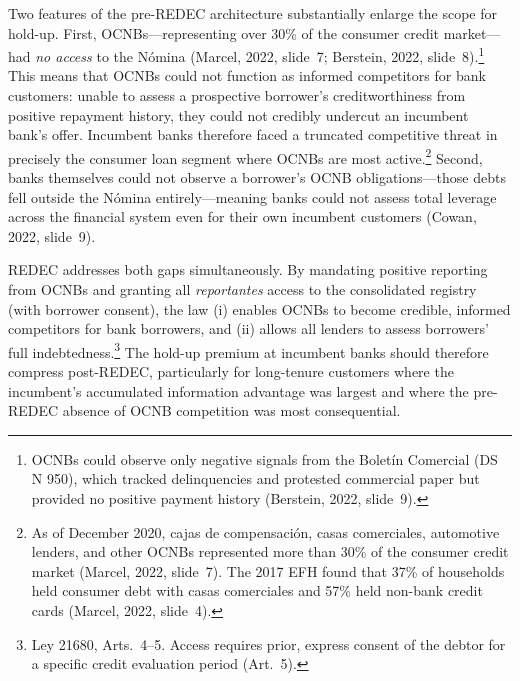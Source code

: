 \documentclass[12pt]{article}
\theoremstyle{plain}
\theoremstyle{plain}
\begin{document}
Two features of the pre-REDEC architecture substantially enlarge the scope for hold-up. First, OCNBs---representing over 30\% of the consumer credit market---had \textit{no access} to the N\'omina  (Marcel, 2022, slide~7; Berstein, 2022, slide~8).\footnote{OCNBs could observe only negative signals from the Bolet\'in Comercial (DS N\textdegree{} 950), which tracked delinquencies and protested commercial paper but provided no positive payment history (Berstein, 2022, slide~9).} This means that OCNBs could not function as informed competitors for bank customers: unable to assess a prospective borrower's creditworthiness from positive repayment history, they could not credibly undercut an incumbent bank's offer. Incumbent banks therefore faced a truncated competitive threat in precisely the consumer loan segment where OCNBs are most active.\footnote{As of December 2020, cajas de compensaci\'on, casas comerciales, automotive lenders, and other OCNBs represented more than 30\% of the consumer credit market (Marcel, 2022, slide~7). The 2017 EFH found that 37\% of households held consumer debt with casas comerciales and 57\% held non-bank credit cards (Marcel, 2022, slide~4).} Second, banks themselves could not observe a borrower's OCNB obligations---those debts fell outside the N\'omina entirely---meaning banks could not assess total leverage across the financial system even for their own incumbent customers (Cowan, 2022, slide~9).

REDEC addresses both gaps simultaneously. By mandating positive reporting from OCNBs and granting all \textit{reportantes} access to the consolidated registry (with borrower consent), the law (i) enables OCNBs to become credible, informed competitors for bank borrowers, and (ii) allows all lenders to assess borrowers' full indebtedness.\footnote{Ley 21680, Arts.\ 4--5. Access requires prior, express consent of the debtor for a specific credit evaluation period (Art.\ 5).} The hold-up premium at incumbent banks should therefore compress post-REDEC, particularly for long-tenure customers where the incumbent's accumulated information advantage was largest and where the pre-REDEC absence of OCNB competition was most consequential.
\end{document}
